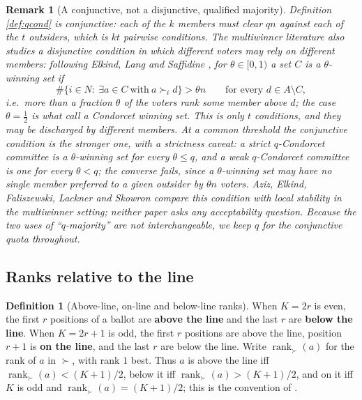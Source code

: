 \documentclass[11pt]{article}
\theoremstyle{plain}
\newtheorem{remark}{Remark}
\theoremstyle{definition}
\newtheorem{definition}{Definition}
\begin{document}
\begin{remark}[A conjunctive, not a disjunctive, qualified majority]
\label{rem:conjunctive}
Definition \ref{def:qcond} is \emph{conjunctive}: each of the $k$ members must clear $qn$ against each of the $t$ outsiders, which is $kt$ pairwise conditions. The multiwinner literature also studies a \emph{disjunctive} condition in which different voters may rely on different members: following Elkind, Lang and Saffidine \cite{ElkindLangSaffidine2015}, for $\theta\in[0,1)$ a set $C$ is a \emph{$\theta$-winning set} if
\[
\#\bigl\{i\in N:\ \exists a\in C\ \text{with}\ a\succ_i d\bigr\}>\theta n
\qquad\text{for every } d\in A\setminus C,
\]
i.e.\ more than a fraction $\theta$ of the voters rank \emph{some} member above $d$; the case $\theta=\frac12$ is what \cite{ElkindLangSaffidine2015} call a Condorcet winning set. This is only $t$ conditions, and they may be discharged by different members. At a common threshold the conjunctive condition is the stronger one, with a strictness caveat: a strict $q$-Condorcet committee is a $\theta$-winning set for every $\theta\le q$, and a weak $q$-Condorcet committee is one for every $\theta<q$; the converse fails, since a $\theta$-winning set may have no single member preferred to a given outsider by $\theta n$ voters. Aziz, Elkind, Faliszewski, Lackner and Skowron \cite{AzizEtAl2017} compare this condition with local stability in the multiwinner setting; neither paper asks any acceptability question. Because the two uses of ``$q$-majority'' are not interchangeable, we keep $q$ for the conjunctive quota throughout.
\end{remark}

\subsection{Ranks relative to the line}

\begin{definition}[Above-line, on-line and below-line ranks]
\label{def:ranks}
When $K=2r$ is even, the first $r$ positions of a ballot are \textbf{above the line} and the last $r$ are \textbf{below the line}. When $K=2r+1$ is odd, the first $r$ positions are above the line, position $r+1$ is \textbf{on the line}, and the last $r$ are below the line. Write $\operatorname{rank}_{\succ}(a)$ for the rank of $a$ in $\succ$, with rank $1$ best. Thus $a$ is above the line iff $\operatorname{rank}_\succ(a)<(K+1)/2$, below it iff $\operatorname{rank}_\succ(a)>(K+1)/2$, and on it iff $K$ is odd and $\operatorname{rank}_\succ(a)=(K+1)/2$; this is the convention of \cite[p.~16]{DissMahajne2020}.
\end{definition}
\end{document}
